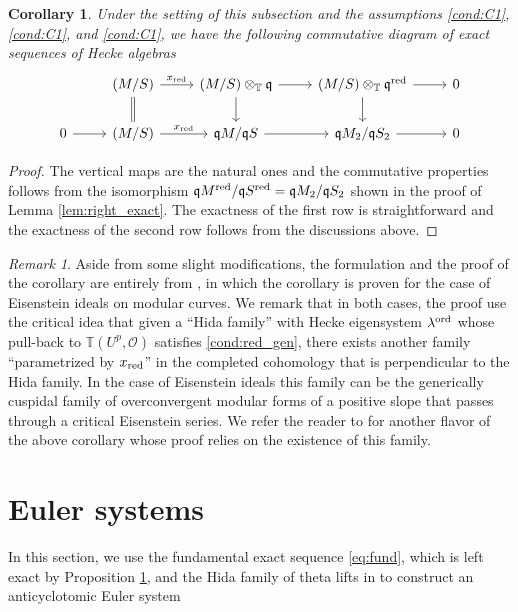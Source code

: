 \documentclass[leqno]{amsart}
\newtheorem{cor}[thm]{Corollary}
\theoremstyle{definition}
\theoremstyle{remark}
\newtheorem{rem}[thm]{Remark}
\newcommand{\oo}{\mathcal{O}}
\newcommand{\fq}{\mathfrak{q}}
\newcommand{\red}{\textnormal{red}}
\newcommand{\xx}{x_\textnormal{red}}
\newcommand{\TT}{\mathbb{T}} %
\newcommand{\ord}{\textnormal{ord}} %
\begin{document}
\begin{cor}\label{cor:fund}
	Under the setting of this subsection
    and the assumptions
    \ref{cond:C1},
    \ref{cond:C1}, and
    \ref{cond:C1},
    we have the following commutative diagram
    of exact sequences of Hecke algebras
    \begin{equation}
    \begin{tikzcd}
    & (M/S)
    \arrow[r,"\xx"]\arrow[d,equal] &
    (M/S)\otimes_{\TT}\fq
    \arrow[r]\arrow[d] &
    (M/S)\otimes_{\TT}\fq^\red
    \arrow[r]\arrow[d] &0\\
    0\arrow[r] &
    (M/S)
    \arrow[r,"\xx"] &
    \fq M/\fq S
    \arrow[r] &
    \fq M_2/\fq S_2
    \arrow[r] &0
    \end{tikzcd}
    \end{equation}
\end{cor}
\begin{proof}
The vertical maps are the natural ones
and the commutative properties 
follows from the isomorphism
$\fq M^\red/\fq S^\red=\fq M_2/\fq S_2$
shown in the proof of Lemma \ref{lem:right_exact}.
The exactness of the first row
is straightforward and
the exactness of the second row
follows from the discussions above.
\end{proof}

\begin{rem}
Aside from some slight modifications,
the formulation and the proof of the corollary
are entirely from \cite[Prop. 6.3.5]{urban},
in which the corollary is proven 
for the case of Eisenstein ideals on modular curves.
We remark that in both cases,
the proof use
the critical idea that 
given a ``Hida family'' with Hecke eigensystem
$\lambda^{\ord}$ whose pull-back to $\TT(U^p,\oo)$
satisfies \eqref{cond:red_gen},
there exists another family ``parametrized by $\xx$''
in the completed cohomology that
is perpendicular to the Hida family.
In the case of Eisenstein ideals
this family can be the generically cuspidal family
of overconvergent modular forms of a positive slope
that passes through a critical Eisenstein series.
We refer the reader to \cite[Thm 3.4.1]{urban}
for another flavor of the above corollary 
whose proof relies on the existence of this family.
\end{rem}


\section{Euler systems}

In this section,
we use the fundamental exact sequence
\eqref{eq:fund}, which is left exact
by Proposition \ref{cor:fund},
and the Hida family of theta lifts in \cite{lee}
to construct an anticyclotomic Euler system
\end{document}
